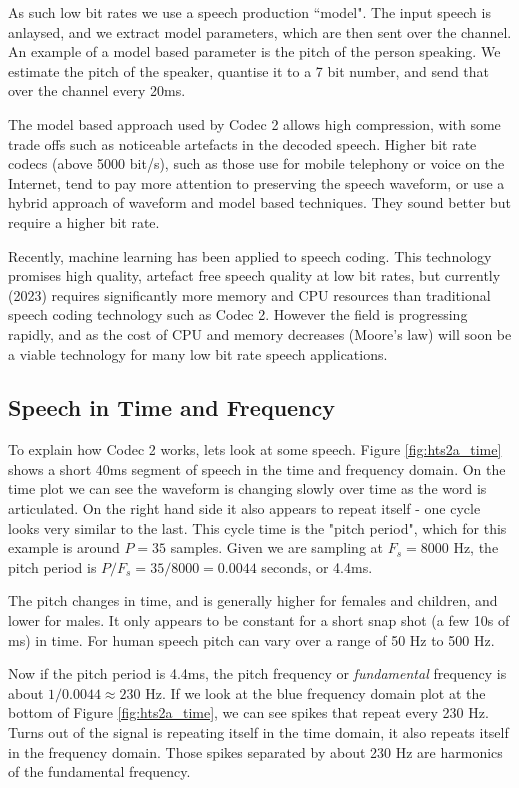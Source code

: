 \documentclass{article}
\begin{document}
As such low bit rates we use a speech production ``model".  The input speech is anlaysed, and we extract model parameters, which are then sent over the channel.  An example of a model based parameter is the pitch of the person speaking.  We estimate the pitch of the speaker, quantise it to a 7 bit number, and send that over the channel every 20ms.

The model based approach used by Codec 2 allows high compression, with some trade offs such as noticeable artefacts in the decoded speech.  Higher bit rate codecs (above 5000 bit/s), such as those use for mobile telephony or voice on the Internet, tend to pay more attention to preserving the speech waveform, or use a hybrid approach of waveform and model based techniques.  They sound better but require a higher bit rate.

Recently, machine learning has been applied to speech coding.  This technology promises high quality, artefact free speech quality at low bit rates, but currently (2023) requires significantly more memory and CPU resources than traditional speech coding technology such as Codec 2.  However the field is progressing rapidly, and as the cost of CPU and memory decreases (Moore's law) will soon be a viable technology for many low bit rate speech applications.

\subsection{Speech in Time and Frequency}

To explain how Codec 2 works, lets look at some speech. Figure \ref{fig:hts2a_time} shows a short 40ms segment of speech in the time and frequency domain.  On the time plot we can see the waveform is changing slowly over time as the word is articulated.  On the right hand side it also appears to repeat itself - one cycle looks very similar to the last.  This cycle time is the "pitch period", which for this example is around $P=35$ samples.  Given we are sampling at $F_s=8000$ Hz, the pitch period is $P/F_s=35/8000=0.0044$ seconds, or 4.4ms.

The pitch changes in time, and is generally higher for females and children, and lower for males.  It only appears to be constant for a short snap shot (a few 10s of ms) in time.  For human speech pitch can vary over a range of 50 Hz to 500 Hz.

Now if the pitch period is 4.4ms, the pitch frequency or \emph{fundamental} frequency is about $1/0.0044 \approx 230$ Hz.  If we look at the blue frequency domain plot at the bottom of Figure \ref{fig:hts2a_time}, we can see spikes that repeat every 230 Hz.  Turns out of the signal is repeating itself in the time domain, it also repeats itself in the frequency domain.  Those spikes separated by about 230 Hz are harmonics of the fundamental frequency.
\end{document}
